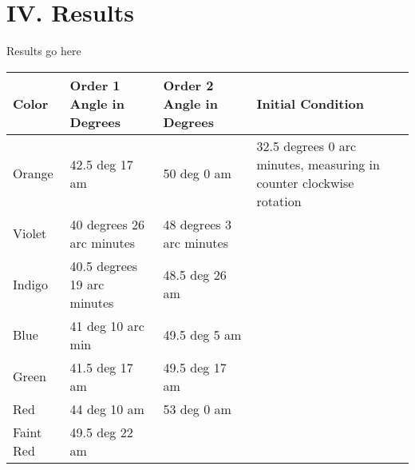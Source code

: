 \documentclass{article}
\begin{document}
\section*{IV. Results}
Results go here
\begin{table}[H]
\begin{tabular}{|l|l|l|l|}
\hline
Color     & Order 1 Angle in Degrees    & Order 2 Angle in Degrees & Initial Condition                                                   \\ \hline
Orange    & 42.5 deg 17 am              & 50 deg 0 am              & 32.5 degrees 0 arc minutes, measuring in counter clockwise rotation \\ \hline
Violet    & 40 degrees 26 arc minutes   & 48 degrees 3 arc minutes &                                                                     \\ \hline
Indigo    & 40.5 degrees 19 arc minutes & 48.5 deg 26 am           &                                                                     \\ \hline
Blue      & 41 deg 10 arc min           & 49.5 deg 5 am            &                                                                     \\ \hline
Green     & 41.5 deg 17 am              & 49.5 deg 17 am           &                                                                     \\ \hline
Red       & 44 deg 10 am                & 53 deg 0 am              &                                                                     \\ \hline
Faint Red & 49.5 deg 22 am              &                          &                                                                     \\ \hline
\end{tabular}
\end{table}
\end{document}
